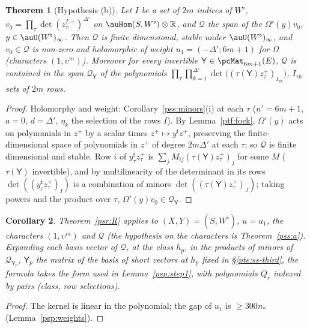\documentclass[10pt]{amsart}
\newtheorem{theorem}{Theorem}[section]
\newtheorem{corollary}[theorem]{Corollary}
\theoremstyle{definition}
\theoremstyle{remark}
\newcommand{\R}{\mathbb R}
\begin{document}
\begin{theorem}[Hypothesis (b)]\label{pss:b}
Let $I$ be a set of $2m$ indices of $W^\flat$, $v_0=\prod_\tau\det(z^{I,+}_\tau)^{\Delta'}$ on $\auHom(S,W^\flat)\otimes\R$,
and $\mathcal Q$ the span of the $\Omega'(y)v_0$, $y\in\auU(W^\flat)_\infty$. Then $\mathcal Q$ is finite
dimensional, stable under $\auU(W^\flat)_\infty$, and $v_0\in\mathcal Q$ is non-zero and holomorphic of weight
$u_1=(-\Delta';6m+1)$ for $\Omega$ \textup(characters $(1,\upsilon^m)$\textup). Moreover for every invertible
$\mathsf Y\in\pcMat_{6m+1}(E)$, $\mathcal Q$ is contained in the span $\mathcal Q_{\mathsf Y}$ of the polynomials
$\prod_\tau\prod_{k=1}^{\Delta'}\det\bigl((\tau(\mathsf Y)z^+_\tau)_{I_{\tau k}}\bigr)$, $I_{\tau k}$ sets of $2m$ rows.
\end{theorem}
\begin{proof}
Holomorphy and weight: Corollary~\ref{pss:minors}(i) at each $\tau$ ($n'=6m+1$, $a=0$, $d=\Delta'$, $\eta_k$ the
selection of the rows $I$). By Lemma~\ref{ptf:fock}, $\Omega'(y)$ acts on polynomials in $z^+$ by a scalar
times $z^+\mapsto y^{\mathsf t}z^+$, preserving the finite-dimensional space of polynomials in $z^+$ of degree
$2m\Delta'$ at each $\tau$; so $\mathcal Q$ is finite dimensional and stable. Row $i$ of $y_\tau^{\mathsf t}z^+_\tau$ is
$\sum_jM_{ij}(\tau(\mathsf Y)z^+_\tau)_j$ for some $M$ ($\tau(\mathsf Y)$ invertible), and by multilinearity of the determinant in
its rows $\det((y^{\mathsf t}_\tau z^+_\tau)_I)$ is a combination of minors $\det((\tau(\mathsf Y)z^+_\tau)_J)$; taking powers and
the product over $\tau$, $\Omega'(y)v_0\in\mathcal Q_{\mathsf Y}$.
\end{proof}

\begin{corollary}\label{pss:bcor}
Theorem~\ref{psr:R} applies to $(X,Y)=(S,W^\flat)$, $u=u_1$, the characters $(1,\upsilon^m)$ and $\mathcal Q$
\textup(the hypothesis on the characters is Theorem~\ref{pss:a}\textup). Expanding each basis vector of $\mathcal Q$,
at the class $h_p$, in the products of minors of $\mathcal Q_{\mathsf Y_p}$, $\mathsf Y_p$ the matrix of the basis of short vectors
at $h_p$ fixed in \S\ref{pte:ss-third}, the formula takes the form used in Lemma~\ref{psp:step1}, with
polynomials $Q_r$ indexed by pairs \textup(class, row selections\textup).
\end{corollary}
\begin{proof}
The kernel is linear in the polynomial; the gap of $u_1$ is $\ge300n_*$ (Lemma~\ref{psp:weights}).
\end{proof}
\end{document}
